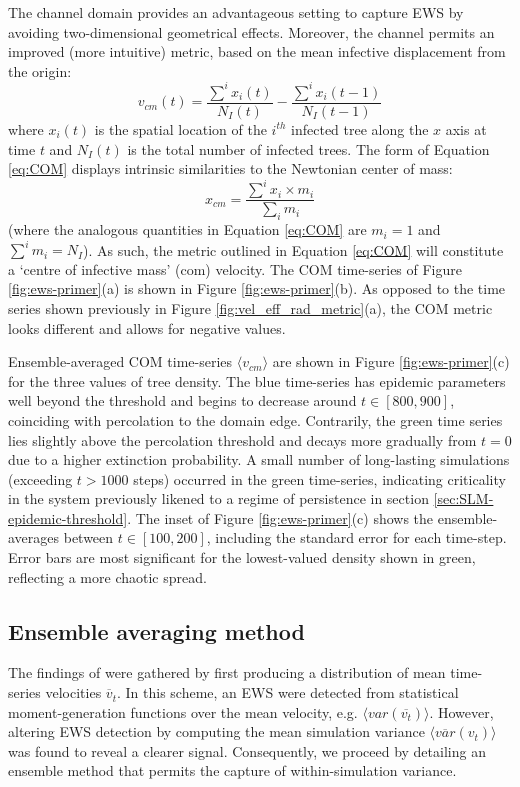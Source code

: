The channel domain provides an advantageous setting to capture EWS by avoiding two-dimensional geometrical effects.
Moreover, the channel permits an improved (more intuitive) metric, based on the mean infective displacement from the origin:
\begin{equation}
   v_{cm}(t) = \frac{\sum^i x_i(t)}{N_I(t)} - \frac{\sum^i x_i(t-1)}{N_I(t-1)}
   \label{eq:COM}
\end{equation}
where $x_i(t)$ is the spatial location of the $i^{th}$ infected tree along the $x$ axis at time $t$ and $N_I(t)$ is the total number of infected trees. 
The form of Equation \ref{eq:COM} displays intrinsic similarities to the Newtonian center of mass:
 \[x_{cm} = \frac{\sum^i x_i\times m_i}{\sum_i m_i}\]
(where the analogous quantities in Equation \ref{eq:COM} are $m_i=1$ and $\sum^im_i= N_I$).
As such, the metric outlined in Equation \ref{eq:COM} will constitute a `centre of infective mass' (\acrshort{com}) velocity.
The COM time-series of Figure \ref{fig:ews-primer}(a) is shown in Figure \ref{fig:ews-primer}(b).
As opposed to the time series shown previously in Figure \ref{fig:vel_eff_rad_metric}(a), the COM metric looks different and allows for negative values.

Ensemble-averaged COM time-series $\langle v_{cm}\rangle$ are shown in Figure \ref{fig:ews-primer}(c) for the three values of tree density.
The blue time-series has epidemic parameters well beyond the threshold and begins to decrease around $t \in [800, 900]$, coinciding with percolation to the domain edge.
Contrarily, the green time series lies slightly above the percolation threshold and decays more gradually from $t=0$ due to a higher extinction probability. 
A small number of long-lasting simulations (exceeding $t>1000$ steps) occurred in the green time-series, indicating criticality in the system\textemdash 
previously likened to a regime of persistence in section \ref{sec:SLM-epidemic-threshold}.
The inset of Figure \ref{fig:ews-primer}(c) shows the ensemble-averages between $t\in [100, 200]$, including the standard error for each time-step.
Error bars are most significant for the lowest-valued density shown in green, reflecting a more chaotic spread.

\subsection{Ensemble averaging method}

The findings of \cite{OROZCOFUENTES201912} were gathered by first producing a distribution of mean time-series velocities $\overline{v}_t$.
In this scheme, an EWS were detected from statistical moment-generation functions over the mean velocity, e.g. $\big\langle var(\overline{v_t}) \big\rangle $.
However, altering EWS detection by computing the mean simulation variance $ \big\langle \overline{var}({v}_t) \big\rangle $ was found to reveal a clearer signal.
Consequently, we proceed by detailing an ensemble method that permits the capture of within-simulation variance. 

